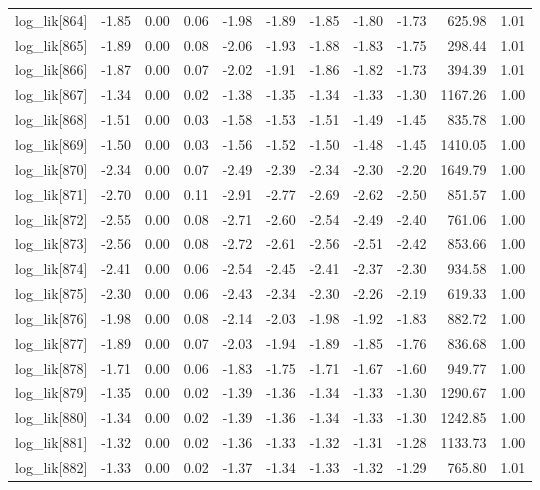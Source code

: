 \begin{table}[ht]
\begin{tabular}{rrrrrrrrrrr}
  log\_lik[864] & -1.85 & 0.00 & 0.06 & -1.98 & -1.89 & -1.85 & -1.80 & -1.73 & 625.98 & 1.01 \\ 
  log\_lik[865] & -1.89 & 0.00 & 0.08 & -2.06 & -1.93 & -1.88 & -1.83 & -1.75 & 298.44 & 1.01 \\ 
  log\_lik[866] & -1.87 & 0.00 & 0.07 & -2.02 & -1.91 & -1.86 & -1.82 & -1.73 & 394.39 & 1.01 \\ 
  log\_lik[867] & -1.34 & 0.00 & 0.02 & -1.38 & -1.35 & -1.34 & -1.33 & -1.30 & 1167.26 & 1.00 \\ 
  log\_lik[868] & -1.51 & 0.00 & 0.03 & -1.58 & -1.53 & -1.51 & -1.49 & -1.45 & 835.78 & 1.00 \\ 
  log\_lik[869] & -1.50 & 0.00 & 0.03 & -1.56 & -1.52 & -1.50 & -1.48 & -1.45 & 1410.05 & 1.00 \\ 
  log\_lik[870] & -2.34 & 0.00 & 0.07 & -2.49 & -2.39 & -2.34 & -2.30 & -2.20 & 1649.79 & 1.00 \\ 
  log\_lik[871] & -2.70 & 0.00 & 0.11 & -2.91 & -2.77 & -2.69 & -2.62 & -2.50 & 851.57 & 1.00 \\ 
  log\_lik[872] & -2.55 & 0.00 & 0.08 & -2.71 & -2.60 & -2.54 & -2.49 & -2.40 & 761.06 & 1.00 \\ 
  log\_lik[873] & -2.56 & 0.00 & 0.08 & -2.72 & -2.61 & -2.56 & -2.51 & -2.42 & 853.66 & 1.00 \\ 
  log\_lik[874] & -2.41 & 0.00 & 0.06 & -2.54 & -2.45 & -2.41 & -2.37 & -2.30 & 934.58 & 1.00 \\ 
  log\_lik[875] & -2.30 & 0.00 & 0.06 & -2.43 & -2.34 & -2.30 & -2.26 & -2.19 & 619.33 & 1.00 \\ 
  log\_lik[876] & -1.98 & 0.00 & 0.08 & -2.14 & -2.03 & -1.98 & -1.92 & -1.83 & 882.72 & 1.00 \\ 
  log\_lik[877] & -1.89 & 0.00 & 0.07 & -2.03 & -1.94 & -1.89 & -1.85 & -1.76 & 836.68 & 1.00 \\ 
  log\_lik[878] & -1.71 & 0.00 & 0.06 & -1.83 & -1.75 & -1.71 & -1.67 & -1.60 & 949.77 & 1.00 \\ 
  log\_lik[879] & -1.35 & 0.00 & 0.02 & -1.39 & -1.36 & -1.34 & -1.33 & -1.30 & 1290.67 & 1.00 \\ 
  log\_lik[880] & -1.34 & 0.00 & 0.02 & -1.39 & -1.36 & -1.34 & -1.33 & -1.30 & 1242.85 & 1.00 \\ 
  log\_lik[881] & -1.32 & 0.00 & 0.02 & -1.36 & -1.33 & -1.32 & -1.31 & -1.28 & 1133.73 & 1.00 \\ 
  log\_lik[882] & -1.33 & 0.00 & 0.02 & -1.37 & -1.34 & -1.33 & -1.32 & -1.29 & 765.80 & 1.01 \\ 

\end{tabular}
\end{table}
